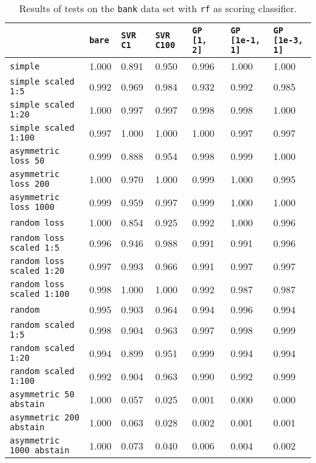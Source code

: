 \begin{table}
{\scriptsize
\begin{tabu}{l|l|l|l|l|l|l}
&\texttt{bare} &\texttt{SVR C1} &\texttt{SVR C100} &\texttt{GP [1, 2]} &\texttt{GP [1e-1, 1]} &\texttt{GP [1e-3, 1]}  \\
\hline
\texttt{simple} &1.000 &0.891 &0.950 &0.996 &1.000 &1.000 \\
\texttt{simple scaled 1:5} &0.992 &0.969 &0.984 &0.932 &0.992 &0.985 \\
\texttt{simple scaled 1:20} &1.000 &0.997 &0.997 &0.998 &0.998 &1.000 \\
\texttt{simple scaled 1:100} &0.997 &1.000 &1.000 &1.000 &0.997 &0.997 \\
\texttt{asymmetric loss 50} &0.999 &0.888 &0.954 &0.998 &0.999 &1.000 \\
\texttt{asymmetric loss 200} &1.000 &0.970 &1.000 &0.999 &1.000 &0.995 \\
\texttt{asymmetric loss 1000} &0.999 &0.959 &0.997 &0.999 &1.000 &1.000 \\
\texttt{random loss} &1.000 &0.854 &0.925 &0.992 &1.000 &0.996 \\
\texttt{random loss scaled 1:5} &0.996 &0.946 &0.988 &0.991 &0.991 &0.996 \\
\texttt{random loss scaled 1:20} &0.997 &0.993 &0.966 &0.991 &0.997 &0.997 \\
\texttt{random loss scaled 1:100} &0.998 &1.000 &1.000 &0.992 &0.987 &0.987 \\
\texttt{random} &0.995 &0.903 &0.964 &0.994 &0.996 &0.994 \\
\texttt{random scaled 1:5} &0.998 &0.904 &0.963 &0.997 &0.998 &0.999 \\
\texttt{random scaled 1:20} &0.994 &0.899 &0.951 &0.999 &0.994 &0.994 \\
\texttt{random scaled 1:100} &0.992 &0.904 &0.963 &0.990 &0.992 &0.999 \\
\texttt{asymmetric 50 abstain} &1.000 &0.057 &0.025 &0.001 &0.000 &0.000 \\
\texttt{asymmetric 200 abstain} &1.000 &0.063 &0.028 &0.002 &0.001 &0.001 \\
\texttt{asymmetric 1000 abstain} &1.000 &0.073 &0.040 &0.006 &0.004 &0.002 \\
\end{tabu} }
\caption{Results of tests on the \texttt{bank} data set
         with \texttt{rf} as scoring classifier.}
\end{table}

